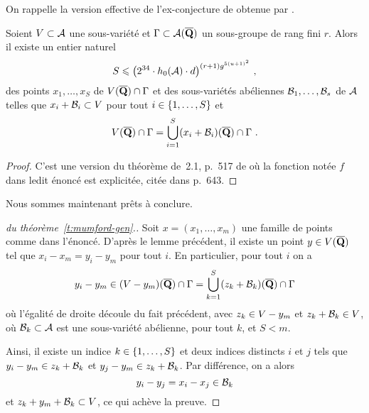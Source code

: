 On rappelle la version effective de l'ex-conjecture de 
obtenue par .

\begin{fact}
  Soient \( V \subset \mathcal A \) une sous-variété et \( \Gamma \subset
    \mathcal A(\overline{{\mathbf{Q}}}) \) un sous-groupe de rang fini \( r \). Alors il existe un
  entier naturel
  \begin{equation}
    S
    \leqslant
    \bigl(
    2^{34} \cdot h_0(\mathcal A) \cdot d
    \bigr)^{ (r+1) g^{ 5(u + 1)^2 } }
    \text{ ,}
  \end{equation}
  des points \( x_1, \dots, x_S \) de \( V(\overline{{\mathbf{Q}}}) \cap \Gamma \) et des
  sous-variétés abéliennes \( \mathcal B_1, \dots, \mathcal B_s \) de \( \mathcal A \) telles que
  \( x_i + \mathcal B_i \subset V \) pour tout \( i \in \lbrace1, \dots, S\rbrace \) et
  \begin{equation}
    V(\overline{{\mathbf{Q}}}) \cap \Gamma
    =
    \bigcup_{i=1}^{S} (x_i + \mathcal B_i)(\overline{{\mathbf{Q}}}) \cap \Gamma
    \text{ .}
  \end{equation}
\end{fact}

\begin{proof}
  C'est une version du théorème de~2.1, p.~517 de \cite{remdcl} où la fonction
  notée \( f \) dans ledit énoncé est explicitée, citée dans \cite{daphimhva2}
  p.~643.
\end{proof}

Nous sommes maintenant prêts à conclure.

\begin{proof}[\proofname{} du théorème~\vref{t:mumford-gen}.]
  Soit \( x = (x_1, \dots, x_m) \) une famille de points comme dans l'énoncé.
  D'après le lemme précédent, il existe un point \( y \in V(\overline{{\mathbf{Q}}}) \)
  tel que \( x_i - x_m = y_i - y_m \) pour tout \( i \). En particulier, pour
  tout \( i \) on a
  \begin{equation}
    y_i - y_m
    \in
    (V - y_m)(\overline{{\mathbf{Q}}}) \cap \Gamma
    =
    \bigcup_{k=1}^{S} (z_k + \mathcal B_k)(\overline{{\mathbf{Q}}}) \cap \Gamma
  \end{equation}
  où l'égalité de droite découle du fait précédent, avec \( z_k \in V -
    y_m \) et \( z_k + \mathcal B_k \in V \), où \( \mathcal B_k \subset \mathcal A \) est
  une sous-variété abélienne, pour tout \( k \), et \( S < m \).

  Ainsi, il existe un indice \( k \in \lbrace1, \dots, S\rbrace \) et deux indices
  distincts \( i \) et \( j \) tels que \( y_i - y_m \in z_k + \mathcal B_k \) et \(
    y_j - y_m \in z_k + \mathcal B_k \). Par différence, on a alors
  \begin{equation}
    y_i - y_j = x_i - x_j \in \mathcal B_k
  \end{equation}
  et \( z_k + y_m + \mathcal B_k \subset V \), ce qui achève la preuve.
\end{proof}


\cleardoublepage
\endinput

